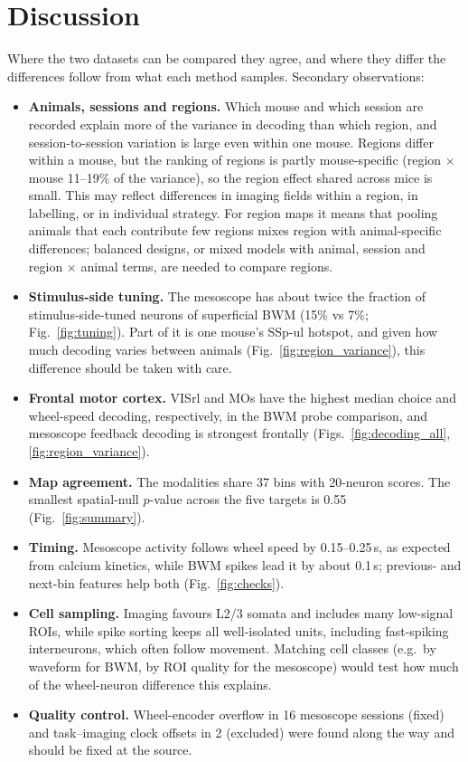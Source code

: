 \documentclass[10pt]{article}
\newcommand{\figref}[1]{Fig.~\ref{fig:#1}}
\begin{document}
\section*{Discussion}
Where the two datasets can be compared they agree, and where they differ the differences follow from what each method samples. Secondary observations:
\begin{itemize}
  \item \textbf{Animals, sessions and regions.} Which mouse and which session are recorded explain more of the variance in decoding than which region, and session-to-session variation is large even within one mouse. Regions differ within a mouse, but the ranking of regions is partly mouse-specific (region $\times$ mouse 11--19\% of the variance), so the region effect shared across mice is small. This may reflect differences in imaging fields within a region, in labelling, or in individual strategy. For region maps it means that pooling animals that each contribute few regions mixes region with animal-specific differences; balanced designs, or mixed models with animal, session and region $\times$ animal terms, are needed to compare regions.
  \item \textbf{Stimulus-side tuning.} The mesoscope has about twice the fraction of stimulus-side-tuned neurons of superficial BWM (15\% vs 7\%; \figref{tuning}). Part of it is one mouse's SSp-ul hotspot, and given how much decoding varies between animals (\figref{region_variance}), this difference should be taken with care.
  \item \textbf{Frontal motor cortex.} VISrl and MOs have the highest median choice and wheel-speed decoding, respectively, in the BWM probe comparison, and mesoscope feedback decoding is strongest frontally (Figs.~\ref{fig:decoding_all}, \ref{fig:region_variance}).
  \item \textbf{Map agreement.} The modalities share 37 bins with 20-neuron scores. The smallest spatial-null $p$-value across the five targets is 0.55 (\figref{summary}).
  \item \textbf{Timing.} Mesoscope activity follows wheel speed by 0.15--0.25\,s, as expected from calcium kinetics, while BWM spikes lead it by about 0.1\,s; previous- and next-bin features help both (\figref{checks}).
  \item \textbf{Cell sampling.} Imaging favours L2/3 somata and includes many low-signal ROIs, while spike sorting keeps all well-isolated units, including fast-spiking interneurons, which often follow movement. Matching cell classes (e.g.\ by waveform for BWM, by ROI quality for the mesoscope) would test how much of the wheel-neuron difference this explains.
  \item \textbf{Quality control.} Wheel-encoder overflow in 16 mesoscope sessions (fixed) and task--imaging clock offsets in 2 (excluded) were found along the way and should be fixed at the source.
\end{itemize}
\end{document}
